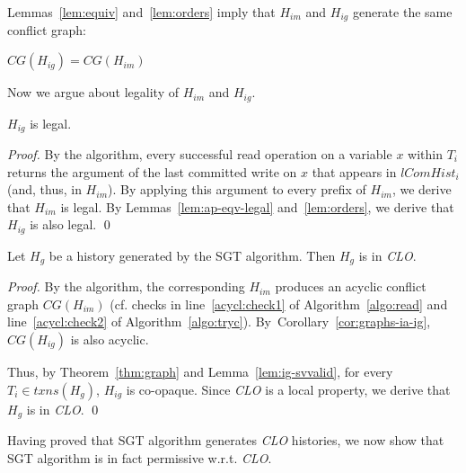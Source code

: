 \documentclass{llncs}
\newcommand{\corref}[1]{Corollary~\ref{cor:#1}}
\newcommand{\op} {operation}
\newcommand{\clo} {\textit{CLO}}
\newcommand{\txns}{\textit{txns}}
\newcommand{\cg}[1] {CG(#1)}
\newcommand{\svvalid} {legal}
\newcommand{\svvalidity} {legality}
\newcommand{\lchist} {\textit{lComHist}}
\newcommand{\coop} {co-opaque}
\newcommand{\sgt} {SGT}
\begin{document}
Lemmas~\ref{lem:equiv} and~\ref{lem:orders} imply that $H_{im}$ 
and $H_{ig}$ generate the same conflict graph:
\begin{corollary}
\label{cor:graphs-ia-ig}
$\cg{H_{ig}}=\cg{H_{im}}$
\end{corollary}


\noindent Now we argue about \svvalidity{} of $H_{im}$ and $H_{ig}$.
\begin{lemma}
\label{lem:ig-svvalid}
$H_{ig}$ is \svvalid.
\end{lemma}
\begin{proof}
By the algorithm, every successful read \op{} on a variable $x$ within
$T_i$ returns the argument of the last committed write on $x$ 
that appears in $\lchist_i$ (and, thus, in $H_{im}$).   
By applying this argument to every prefix of $H_{im}$, 
we derive that $H_{im}$ is \svvalid. By Lemmas~\ref{lem:ap-eqv-legal} and~\ref{lem:orders}, 
we derive that $H_{ig}$ is also legal. \qed
\end{proof}


\begin{theorem}
\label{thm:gen-clo}
Let $H_g$ be a history generated by the \sgt{} algorithm. 
Then $H_g$ is in \clo.
\end{theorem}
\begin{proof}
By the algorithm, the corresponding $H_{im}$ produces an acyclic conflict graph 
$CG(H_{im})$ (cf. checks in line~\ref{acycl:check1} of
Algorithm~\ref{algo:read} 
and line~\ref{acycl:check2} of Algorithm~\ref{algo:tryc}).
By~\corref{graphs-ia-ig}, $CG(H_{ig})$ is also acyclic.

Thus, by Theorem~\ref{thm:graph} and Lemma~\ref{lem:ig-svvalid}, 
for every $T_i\in\txns(H_g)$, $H_{ig}$
is \coop. Since \clo{} is a local property, we derive that $H_g$ is in
\clo. \qed
\end{proof}

Having proved that \sgt{} algorithm generates \clo{} histories, 
we now show that \sgt{} algorithm is in fact permissive w.r.t. \clo{}. 
\end{document}
